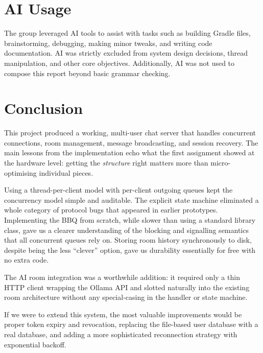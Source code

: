 \documentclass[12pt,a4paper]{article}
\begin{document}
\section{AI Usage}
\label{sec:ai_usage}

The group leveraged AI tools to assist with tasks such as building Gradle files, brainstorming, debugging, making minor tweaks, and writing code documentation. AI was strictly excluded from system design decisions, thread manipulation, and other core objectives. Additionally, AI was not used to compose this report beyond basic grammar checking.

\section{Conclusion}
\label{sec:conclusion}

This project produced a working, multi-user chat server that handles concurrent
connections, room management, message broadcasting, and session recovery. The
main lessons from the implementation echo what the first assignment showed at
the hardware level: getting the \textit{structure} right matters more than
micro-optimising individual pieces.

Using a thread-per-client model with per-client outgoing queues kept the
concurrency model simple and auditable. The explicit state machine eliminated a
whole category of protocol bugs that appeared in earlier prototypes. Implementing
the BBQ from scratch, while slower than using a standard library class, gave us
a clearer understanding of the blocking and signalling semantics that all
concurrent queues rely on. Storing room history synchronously to disk, despite
being the less ``clever'' option, gave us durability essentially for free with
no extra code.

The AI room integration was a worthwhile addition: it required only a thin HTTP
client wrapping the Ollama API and slotted naturally into the existing room
architecture without any special-casing in the handler or state machine.

If we were to extend this system, the most valuable improvements would be
proper token expiry and revocation, replacing the file-based user database with
a real database, and adding a more sophisticated reconnection strategy with
exponential backoff.
\end{document}
